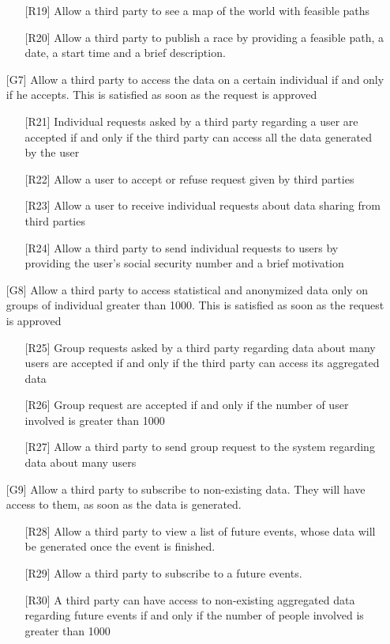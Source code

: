 \begin{itemize}
\begin{itemize}
	\item[{[R19]}] Allow a third party to see a map of the world with feasible paths
	\item[{[R20]}] Allow a third party to publish a race by providing a feasible path, a date, a start time and a brief description.
	\end{itemize}
\item[{[G7]}] Allow a third party to access the data on a certain individual if and only if he accepts. This is satisfied as soon as the request is approved
	\begin{itemize}
	\item[{[R21]}] Individual requests asked by a third party regarding a user are accepted if and only if the third party can access all the data generated by the user
	\item[{[R22]}] Allow a user to accept or refuse request given by third parties
	\item[{[R23]}] Allow a user to receive individual requests about data sharing from third parties
	\item[{[R24]}] Allow a third party to send individual requests to users by providing the user's social security number and a brief motivation
	\end{itemize}
\item[{[G8]}] Allow a third party to access statistical and anonymized data only on groups of individual greater than 1000. This is satisfied as soon as the request is approved
	\begin{itemize}
	\item[{[R25]}] Group requests asked by a third party regarding data about many users are accepted if and only if the third party can access its aggregated data
	\item[{[R26]}] Group request are accepted if and only if the number of user involved is greater than 1000
	\item[{[R27]}] Allow a third party to send group request to the system regarding data about many users
	\end{itemize}
\item[{[G9]}] Allow a third party to subscribe to non-existing data. They will have access to them, as soon as the data is generated. 
	\begin{itemize}
	\item[{[R28]}] Allow a third party to view a list of future events, whose data will be generated once the event is finished.
	\item[{[R29]}] Allow a third party to subscribe to a future events.
	\item[{[R30]}] A third party can have access to non-existing aggregated data regarding future events if and only if the number of people involved is greater than 1000
	\end{itemize}
\end{itemize}